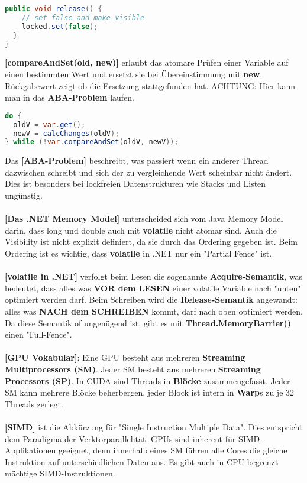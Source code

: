 \documentclass[8pt]{extarticle}
\let\oldtextbf\textbf
\renewcommand{\textbf}{\tiny\oldtextbf}
\begin{document}
\begin{multicols*}{5}
\begin{lstlisting}[language=java]
  public void release() {
    // set false and make visible
    locked.set(false);
  }
}
\end{lstlisting}
\textbf{[compareAndSet(old, new)]} erlaubt das atomare Prüfen einer Variable auf einen bestimmten Wert und ersetzt sie bei Übereinstimmung mit \textbf{new}. Rückgabewert zeigt ob die Ersetzung stattgefunden hat. ACHTUNG: Hier kann man in das \textbf{ABA-Problem} laufen.
\begin{lstlisting}[language=java]
do {
  oldV = var.get();
  newV = calcChanges(oldV);
} while (!var.compareAndSet(oldV, newV));
\end{lstlisting}
Das \textbf{[ABA-Problem]} beschreibt, was passiert wenn ein anderer Thread dazwischen schreibt und sich der zu vergleichende Wert scheinbar nicht ändert. Dies ist besonders bei lockfreien Datenstrukturen wie Stacks und Listen ungünstig.\\\\
\textbf{[Das .NET Memory Model]} unterscheided sich vom Java Memory Model darin, dass long und double auch mit \textbf{volatile} nicht atomar sind. Auch die Visibility ist nicht explizit definiert, da sie durch das Ordering gegeben ist. Beim Ordering ist es wichtig, dass \textbf{volatile} in .NET nur ein "Partial Fence" ist.\\\\
\textbf{[volatile in .NET]} verfolgt beim Lesen die sogenannte \textbf{Acquire-Semantik}, was bedeutet, dass alles was \textbf{VOR dem LESEN} einer volatile Variable nach "unten" optimiert werden darf. Beim Schreiben wird die \textbf{Release-Semantik} angewandt: alles was \textbf{NACH dem SCHREIBEN} kommt, darf nach oben optimiert werden. Da diese Semantik of ungenügend ist, gibt es mit \textbf{Thread.MemoryBarrier()} einen "Full-Fence".\\\\
\textbf{[GPU Vokabular]}: Eine GPU besteht aus mehreren \textbf{Streaming Multiprocessors (SM)}. Jeder SM besteht aus mehreren \textbf{Streaming Processors (SP)}. In CUDA sind Threads in \textbf{Blöcke} zusammengefasst. Jeder SM kann mehrere Blöcke beherbergen, jeder Block ist intern in \textbf{Warp}s zu je 32 Threads zerlegt.\\\\
\textbf{[SIMD]} ist die Abkürzung für "Single Instruction Multiple Data". Dies entspricht dem Paradigma der Verktorparallelität. GPUs sind inherent für SIMD-Applikationen geeignet, denn innerhalb eines SM führen alle Cores die gleiche Instruktion auf unterschiedlichen Daten aus. Es gibt auch in CPU begrenzt mächtige SIMD-Instruktionen.\\\\

\end{multicols*}
\end{document}
